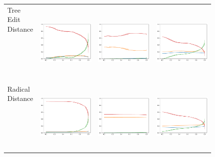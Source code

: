 \begin{figure}
\begin{tabular}{lccc}
\shortstack{Tree Edit\\Distance\\\text{ }\\\text{ }\\\text{ }\\\text{ }\\\text{ }\\\text{ }}      & \includegraphics[width=.25\linewidth]{code/img/operation_count_zss_AT1.pdf} & \includegraphics[width=.25\linewidth]{code/img/operation_count_zss_AT1-2.pdf} & \includegraphics[width=.25\linewidth]{code/img/operation_count_zss_AT2.pdf} \\
\shortstack{Radical\\Distance\\\text{ }\\\text{ }\\\text{ }\\\text{ }\\\text{ }\\\text{ }}       & \includegraphics[width=.25\linewidth]{code/img/operation_count_rrd_AT1.pdf} & \includegraphics[width=.25\linewidth]{code/img/operation_count_rrd_AT1-2.pdf} & \includegraphics[width=.25\linewidth]{code/img/operation_count_rrd_AT2.pdf} \\

\end{tabular}
\end{figure}

